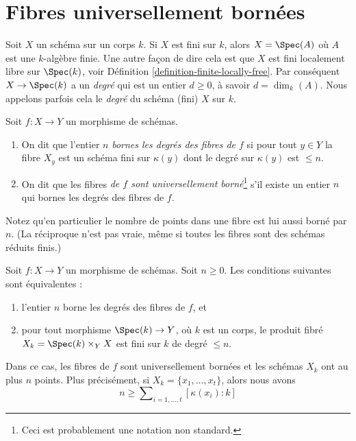 \section{Fibres universellement bornées}
\label{section-universally-bounded}

\noindent
Soit $X$ un schéma sur un corps $k$. Si $X$ est fini sur
$k$, alors $X = \Spec(A)$ où $A$ est une $k$-algèbre finie. Une
autre façon de dire cela est que $X$ est fini localement libre sur $\Spec(k)$,
voir Définition \ref{definition-finite-locally-free}. Par conséquent $X \to \Spec(k)$ a un
{\it degré} qui est un entier $d \geq 0$, à savoir $d = \dim_k(A)$.
Nous appelons parfois cela le {\it degré} du schéma (fini) $X$
sur $k$.

\begin{definition}
\label{definition-universally-bounded}
Soit $f : X \to Y$ un morphisme de schémas.
\begin{enumerate}
\item On dit que l'entier $n$ {\it bornes les degrés des fibres
de $f$} si pour
tout $y \in Y$ la fibre $X_y$ est un schéma fini sur $\kappa(y)$
dont le degré sur $\kappa(y)$ est $\leq n$.
\item On dit que les fibres {\it de $f$ sont universellement borné}\footnote{Ceci
est probablement une notation
non standard.} s'il existe un entier $n$ qui bornes les degrés des fibres de
$f$.
\end{enumerate}
\end{definition}

\noindent
Notez qu'en particulier le nombre de points dans une fibre est lui aussi borné par $n$.
(La réciproque n'est pas vraie, même si toutes les fibres sont des schémas réduits
finis.)

\begin{lemma}
\label{lemma-characterize-universally-bounded}
Soit $f : X \to Y$ un morphisme de schémas. Soit $n \geq 0$. Les conditions
suivantes sont équivalentes :
\begin{enumerate}
\item l'entier $n$ borne les degrés des fibres de $f$, et
\item pour tout morphisme $\Spec(k) \to Y$, où $k$ est un corps,
le produit fibré $X_k = \Spec(k) \times_Y X$ est fini sur $k$ de degré
$\leq n$.
\end{enumerate}
Dans ce cas, les fibres de $f$ sont universellement bornées et les schémas
$X_k$ ont au plus $n$ points. Plus
précisément, si $X_k = \{x_1, \ldots, x_t\}$, alors nous avons
$$
n \geq \sum\nolimits_{i = 1, \ldots, t} [\kappa(x_i) : k]
$$
\end{lemma}

